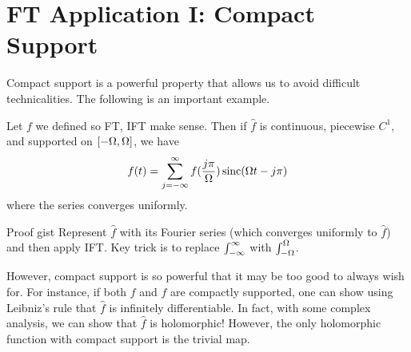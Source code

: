\section{FT Application I: Compact Support}
Compact support is a powerful property that allows us to avoid difficult technicalities. The following is an important example.
\begin{thm}
    Let $f$ we defined so FT, IFT make sense. Then if $\hat{f}$ is continuous, piecewise $C^1$, and supported on $[-\Omega, \Omega]$, we have
    \[
        f(t) = \sum^{\infty}_{j=-\infty} f( \frac{j\pi}{\Omega}) \operatorname{sinc}(\Omega t-j\pi)
    \]
    where the series converges uniformly.
\end{thm}
\begin{details}{Proof gist}
    Represent $\hat{f}$ with its Fourier series (which converges uniformly to $\hat{f}$) and then apply IFT. Key trick is to replace $\int_{-\infty}^\infty$ with $\int_{-\Omega}^{\Omega}$.
\end{details}
However, compact support is so powerful that it may be too good to always wish for. For instance, if both $f$ and $\hat{f}$ are compactly supported, one can show using Leibniz's rule that $\hat{f}$ is infinitely differentiable. In fact, with some complex analysis, we can show that $\hat{f}$ is holomorphic! However, the only holomorphic function with compact support is the trivial map.
